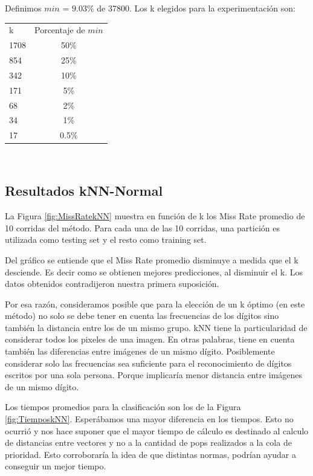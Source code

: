 \documentclass{article}
\begin{document}
Definimos $min$ = $9.03\%$ de 37800. Los k elegidos para la experimentación son: \newline
\begin{center}
\begin{tabular}{ l | c }
 k & Porcentaje de $min$  \\
1708 & 50\% \\
854 & 25\% \\
342 & 10\% \\
171 & 5\% \\
68 & 2\% \\
34 & 1\% \\
17& 0.5\% \\

\end{tabular}
\end{center}
\\

\subsection*{Resultados kNN-Normal}

La Figura \ref{fig:MissRatekNN} muestra en función de k  los Miss Rate promedio de 10 corridas del método. Para cada una de las 10 corridas, una partición es utilizada como testing set y el resto como training set.

Del gráfico se entiende que el Miss Rate promedio disminuye a medida que el k desciende. Es decir como se obtienen mejores predicciones, al disminuir el k. Los datos obtenidos contradijeron nuestra primera suposición.

Por esa razón, consideramos posible que para la elección de un k óptimo (en este método) no solo se debe tener en cuenta las frecuencias de los dígitos sino también la distancia entre los de un mismo grupo. kNN tiene la particularidad de considerar todos los pixeles de una imagen. En otras palabras, tiene en cuenta también las diferencias entre imágenes de un mismo dígito. Posiblemente considerar solo las frecuencias sea suficiente para el reconocimiento de dígitos escritos por una sola persona. Porque implicaría menor distancia entre imágenes de un mismo dígito.

Los tiempos promedios para la clasificación son los de la Figura \ref{fig:TiemposkNN}. Esperábamos una mayor diferencia en los tiempos. Esto no ocurrió y nos hace suponer que el mayor tiempo de cálculo es destinado al calculo de distancias entre vectores y no a la cantidad de pops realizados a la cola de prioridad. Esto corroboraría la idea de que distintas normas, podrían ayudar a conseguir un mejor tiempo.
\end{document}
